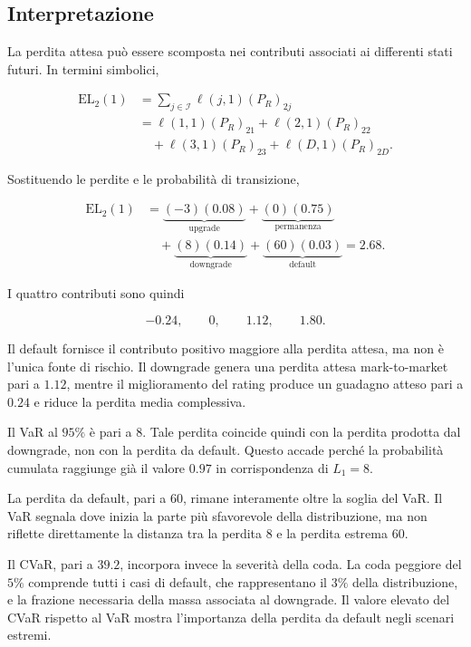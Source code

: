 \subsection{Interpretazione}

\label{subsec:cap9-applicazione-interpretazione}

La perdita attesa pu\`{o} essere scomposta nei contributi associati ai
differenti stati futuri. In termini simbolici,

\[
\begin{split}
\mathrm{EL}_2(1)
&=
\sum_{j\in\mathcal{I}}
\ell(j,1)(P_R)_{2j}
\\
&=
\ell(1,1)(P_R)_{21}
+
\ell(2,1)(P_R)_{22}
\\
&\quad
+
\ell(3,1)(P_R)_{23}
+
\ell(D,1)(P_R)_{2D}.
\end{split}
\]

Sostituendo le perdite e le probabilit\`{a} di transizione,

\[
\begin{split}
\mathrm{EL}_2(1)
&=
\underbrace{(-3)(0.08)}_{\text{upgrade}}
+
\underbrace{(0)(0.75)}_{\text{permanenza}}
\\
&\quad
+
\underbrace{(8)(0.14)}_{\text{downgrade}}
+
\underbrace{(60)(0.03)}_{\text{default}} =2.68.
\end{split}
\]

I quattro contributi sono quindi

\[
-0.24,
\qquad
0,
\qquad
1.12,
\qquad
1.80.
\]

Il default fornisce il contributo positivo maggiore alla perdita
attesa, ma non \`{e} l'unica fonte di rischio. Il downgrade genera una
perdita attesa mark-to-market pari a $1.12$, mentre il miglioramento
del rating produce un guadagno atteso pari a $0.24$ e riduce la perdita
media complessiva.

Il VaR al $95\%$ \`{e} pari a $8$. Tale perdita coincide quindi con la perdita prodotta dal downgrade, non con la perdita da default.
Questo accade perch\'{e} la probabilit\`{a} cumulata raggiunge gi\`{a}
il valore $0.97$ in corrispondenza di $L_1=8$.

La perdita da default, pari a $60$, rimane interamente oltre la soglia
del VaR. Il VaR segnala dove inizia la parte pi\`{u} sfavorevole della
distribuzione, ma non riflette direttamente la distanza tra la perdita
$8$ e la perdita estrema $60$.

Il CVaR, pari a $39.2$, incorpora invece la severit\`{a} della coda. La
coda peggiore del $5\%$ comprende tutti i casi di default, che
rappresentano il $3\%$ della distribuzione, e la frazione necessaria
della massa associata al downgrade. Il valore elevato del CVaR rispetto
al VaR mostra l'importanza della perdita da default negli scenari
estremi.

